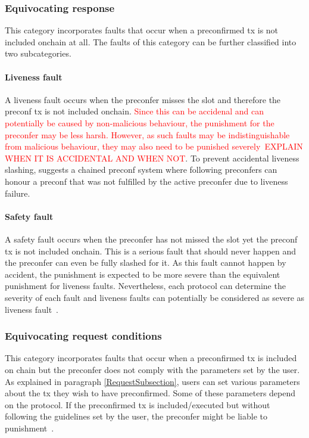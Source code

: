 \documentclass[conference]{IEEEtran}
\theoremstyle{boldstyle}
\begin{document}
        \subsubsection{Equivocating response}
        This category incorporates faults that occur when a preconfirmed tx is not included onchain at all. The faults of this category can be further classified into two subcategories.
        \paragraph{Liveness fault}
        A liveness fault occurs when the preconfer misses the slot and therefore the preconf tx is not included onchain. \textcolor{red}{Since this can be accidenal and can potentially be caused by non-malicious behaviour, the punishment for the preconfer may be less harsh. However, as such faults may be indistinguishable from malicious behaviour, they may also need to be punished severely~\cite{W:Basedpreconfirmations}EXPLAIN WHEN IT IS ACCIDENTAL AND WHEN NOT}. To prevent accidental liveness slashing, \cite{W:AvoidingAccidentalLivenessFaultsforBasedPreconfs} suggests a chained preconf system where following preconfers can honour a preconf that was not fulfilled by the active preconfer due to liveness failure.
        \paragraph{Safety fault}
        A safety fault occurs when the preconfer has not missed the slot yet the preconf tx is not included onchain. This is a serious fault that should never happen and the preconfer can even be fully slashed for it. As this fault cannot happen by accident, the punishment is expected to be more severe than the equivalent punishment for liveness faults. Nevertheless, each protocol can determine the severity of each fault and liveness faults can potentially be considered as severe as liveness fault~\cite{W:Basedpreconfirmations}.
        
        \subsubsection{Equivocating request conditions}
        This category incorporates faults that occur when a preconfirmed tx is included on chain but the preconfer does not comply with the parameters set by the user. As explained in paragraph \ref{RequestSubsection}, users can set various parameters about the tx they wish to have preconfirmed. Some of these parameters depend on the protocol. If the preconfirmed tx is included/executed but without following the guidelines set by the user, the preconfer might be liable to punishment~\cite{W:DelegationinBolt:OutsourcingSophisticationWhilePreservingDecentralization}.
        
\end{document}
